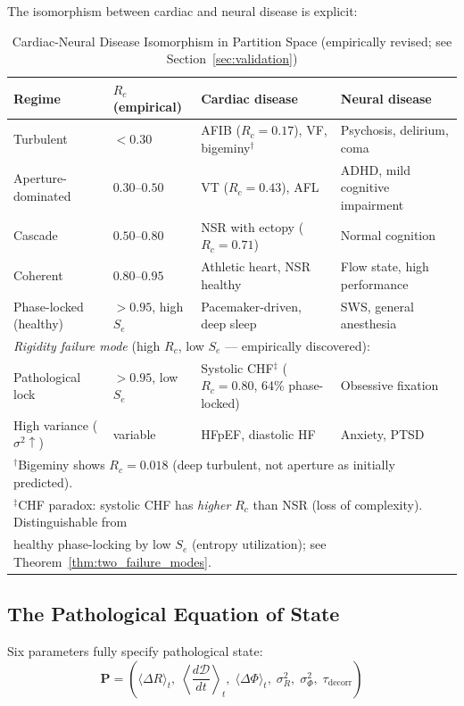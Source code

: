 \documentclass[12pt,a4paper]{article}
\theoremstyle{definition}
\begin{document}
The isomorphism between cardiac and neural disease is explicit:

\begin{table}[H]
\centering
\caption{Cardiac-Neural Disease Isomorphism in Partition Space
(empirically revised; see Section~\ref{sec:validation})}
\label{tab:disease}
\begin{tabular}{llll}
\toprule
\textbf{Regime} & \textbf{$R_c$ (empirical)} & \textbf{Cardiac disease} & \textbf{Neural disease}\\
\midrule
Turbulent & $< 0.30$ & AFIB ($R_c=0.17$), VF, bigeminy$^\dagger$ & Psychosis, delirium, coma\\
Aperture-dominated & $0.30$--$0.50$ & VT ($R_c=0.43$), AFL & ADHD, mild cognitive impairment\\
Cascade & $0.50$--$0.80$ & NSR with ectopy ($R_c=0.71$) & Normal cognition\\
Coherent & $0.80$--$0.95$ & Athletic heart, NSR healthy & Flow state, high performance\\
Phase-locked (healthy) & $> 0.95$, high $S_e$ & Pacemaker-driven, deep sleep & SWS, general anesthesia\\
\midrule
\multicolumn{4}{l}{\textit{Rigidity failure mode} (high $R_c$, low $S_e$ --- empirically discovered):}\\
Pathological lock & $> 0.95$, low $S_e$ & Systolic CHF$^\ddagger$ ($R_c=0.80$, 64\% phase-locked) & Obsessive fixation\\
High variance ($\sigma^2\uparrow$) & variable & HFpEF, diastolic HF & Anxiety, PTSD\\
\bottomrule
\multicolumn{4}{l}{%
$^\dagger$Bigeminy shows $R_c = 0.018$ (deep turbulent, not aperture as initially predicted).}\\
\multicolumn{4}{l}{%
$^\ddagger$CHF paradox: systolic CHF has \emph{higher} $R_c$ than NSR (loss of complexity).
Distinguishable from}\\
\multicolumn{4}{l}{%
healthy phase-locking by low $S_e$ (entropy utilization); see Theorem~\ref{thm:two_failure_modes}.}\\
\end{tabular}
\end{table}

\subsection{The Pathological Equation of State}

Six parameters fully specify pathological state:
\begin{equation}
\mathbf{P} = \left(\langle\Delta R\rangle_t,\; \left\langle\frac{d\mathcal{D}}{dt}\right\rangle_t,\;
\langle\Delta\Phi\rangle_t,\; \sigma^2_R,\; \sigma^2_\Phi,\; \tau_{\text{decorr}}\right)
\end{equation}
\end{document}
